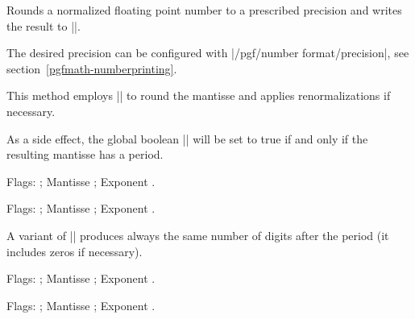 \begin{command}{}
	Rounds a normalized floating point number to a prescribed precision and writes the result to |\pgfmathresult|.

	The desired precision can be configured with |/pgf/number format/precision|, see section~\ref{pgfmath-numberprinting}. 
	
	This method employs |\pgfmathroundto| to round the mantisse and applies renormalizations if necessary.

	As a side effect, the global boolean |\ifpgfmathfloatroundhasperiod| will be set to true if and only if the resulting mantisse has a period.
\begin{codeexample}[]
\pgfmathfloatround{\pgfmathresult}
\pgfmathfloattomacro{\pgfmathresult}{\F}{\M}{\E}
Flags: \F; Mantisse \M; Exponent \E.
\end{codeexample}
\begin{codeexample}[]
\pgfmathfloatround{\pgfmathresult}
\pgfmathfloattomacro{\pgfmathresult}{\F}{\M}{\E}
Flags: \F; Mantisse \M; Exponent \E.
\end{codeexample}
\end{command}

\begin{command}{}
	A variant of |\pgfmathfloatround| produces always the same number of digits after the period (it includes zeros if necessary).
\begin{codeexample}[]
\pgfmathfloatroundzerofill{\pgfmathresult}
\pgfmathfloattomacro{\pgfmathresult}{\F}{\M}{\E}
Flags: \F; Mantisse \M; Exponent \E.
\end{codeexample}
\begin{codeexample}[]
\pgfmathfloatroundzerofill{\pgfmathresult}
\pgfmathfloattomacro{\pgfmathresult}{\F}{\M}{\E}
Flags: \F; Mantisse \M; Exponent \E.
\end{codeexample}
\end{command}

